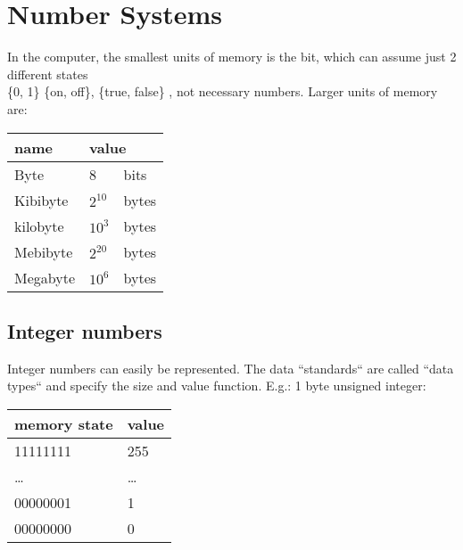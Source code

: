 \chapter{Number Systems}\label{ch:number-systems2}
In the computer, the smallest units of memory is the bit, which can assume
just 2 different states \\
\{0, 1\} \{on, off\}, \{true, false\} , not necessary numbers.
Larger units of memory are:
\begin{center}
    \begin{tabular}{ l l @{ }l}
        \toprule
        name & \multicolumn{2}{l}{value} \\
        \midrule
        Byte     & 8        & bits  \\
        Kibibyte & $2^{10}$ & bytes \\
        kilobyte & $10^3$   & bytes \\
        Mebibyte & $2^{20}$ & bytes \\
        Megabyte & $10^6$   & bytes \\
        \bottomrule
    \end{tabular}
\end{center}


\section{Integer numbers}\label{sec:integer-numbers}
Integer numbers can easily be represented.
The data ``standards`` are called ``data types`` and specify the size and value function.
E.g.: 1 byte unsigned integer:
\begin{center}
    \begin{tabular}{ l l }
        \toprule
        memory state & value  \\
        \midrule
        11111111     & 255    \\
        \ldots       & \ldots \\
        00000001     & 1      \\
        00000000     & 0      \\
        \bottomrule
    \end{tabular}
\end{center}

